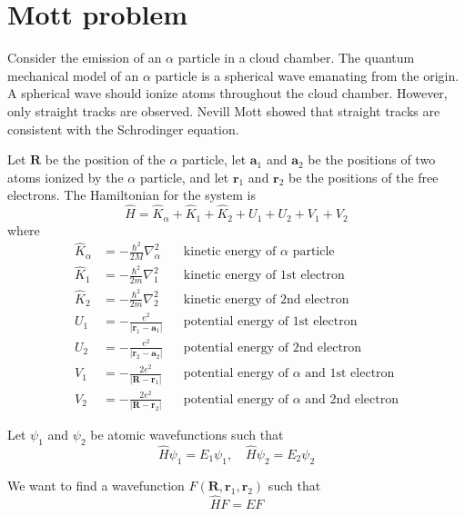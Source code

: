 \documentclass[12pt]{article}
\begin{document}
\section*{Mott problem}

Consider the emission of an $\alpha$ particle in a cloud chamber.
The quantum mechanical model of an $\alpha$ particle is a spherical
wave emanating from the origin.
A spherical wave should ionize atoms throughout the cloud chamber.
However, only straight tracks are observed.
Nevill Mott showed that straight tracks are consistent with the Schrodinger equation.

\bigskip

Let $\mathbf R$ be the position of the $\alpha$ particle,
let $\mathbf a_1$ and $\mathbf a_2$ be the positions of two atoms ionized by the $\alpha$ particle,
and let $\mathbf r_1$ and $\mathbf r_2$ be the positions of the free electrons.
The Hamiltonian for the system is
\begin{equation*}
\hat H=\hat K_\alpha+\hat K_1+\hat K_2+U_1+U_2+V_1+V_2
\end{equation*}
where
\begin{align*}
\hat K_\alpha&=-\frac{\hbar^2}{2M}\nabla_\alpha^2 & & \text{kinetic energy of $\alpha$ particle}
\\[1ex]
\hat K_1&=-\frac{\hbar^2}{2m}\nabla_1^2 & & \text{kinetic energy of 1st electron}
\\[1ex]
\hat K_2&=-\frac{\hbar^2}{2m}\nabla_2^2 & & \text{kinetic energy of 2nd electron}
\\[1ex]
U_1&=-\frac{e^2}{|\mathbf r_1-\mathbf a_1|} & & \text{potential energy of 1st electron}
\\[1ex]
U_2&=-\frac{e^2}{|\mathbf r_2-\mathbf a_2|} & & \text{potential energy of 2nd electron}
\\[1ex]
V_1&=-\frac{2e^2}{|\mathbf R-\mathbf r_1|} & & \text{potential energy of $\alpha$ and 1st electron}
\\[1ex]
V_2&=-\frac{2e^2}{|\mathbf R-\mathbf r_2|} & & \text{potential energy of $\alpha$ and 2nd electron}
\end{align*}

Let $\psi_1$ and $\psi_2$ be atomic wavefunctions such that
\begin{equation*}
\hat H\psi_1=E_1\psi_1,
\quad
\hat H\psi_2=E_2\psi_2
\end{equation*}

We want to find a wavefunction $F(\mathbf R,\mathbf r_1,\mathbf r_2)$ such that
\begin{equation*}
\hat HF=EF
\end{equation*}
\end{document}
